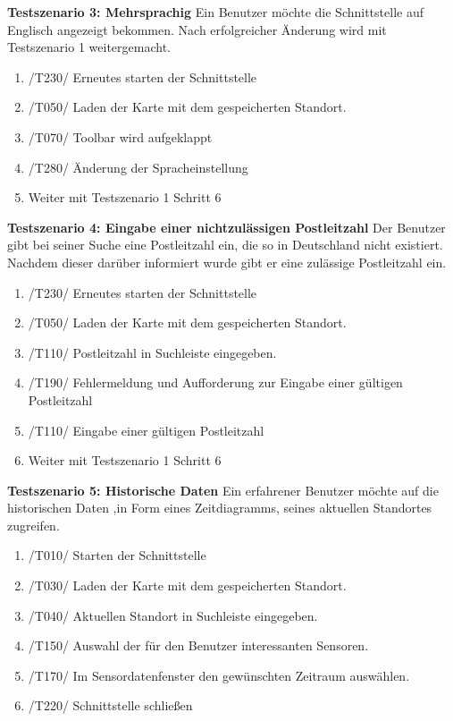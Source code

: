 \textbf{Testszenario 3: Mehrsprachig}
\newline
Ein Benutzer möchte die Schnittstelle auf Englisch angezeigt bekommen. Nach erfolgreicher Änderung wird mit Testszenario 1 weitergemacht.
\begin{enumerate} [noitemsep]
    \item /T230/ Erneutes starten der Schnittstelle
    \item /T050/ Laden der Karte mit dem gespeicherten Standort.
    \item /T070/ Toolbar wird aufgeklappt
    \item /T280/ Änderung der Spracheinstellung
    \item Weiter mit Testszenario 1 Schritt 6
\end{enumerate}

\textbf{Testszenario 4: Eingabe einer nichtzulässigen Postleitzahl}
\newline
Der Benutzer gibt bei seiner Suche eine Postleitzahl ein, die so in Deutschland nicht existiert. Nachdem dieser darüber informiert wurde gibt er eine zulässige Postleitzahl ein.
\begin{enumerate} [noitemsep]
    \item /T230/ Erneutes starten der Schnittstelle
    \item /T050/ Laden der Karte mit dem gespeicherten Standort.
    \item /T110/ Postleitzahl in Suchleiste eingegeben.
    \item /T190/ Fehlermeldung und Aufforderung zur Eingabe einer gültigen Postleitzahl
    \item /T110/ Eingabe einer gültigen Postleitzahl
    \item Weiter mit Testszenario 1 Schritt 6
\end{enumerate}

\textbf{Testszenario 5: Historische Daten}
\newline
Ein erfahrener Benutzer möchte auf die historischen Daten ,in Form eines Zeitdiagramms, seines aktuellen Standortes zugreifen.
\begin{enumerate} [noitemsep]
    \item /T010/ Starten der Schnittstelle
    \item /T030/ Laden der Karte mit dem gespeicherten Standort.
    \item /T040/ Aktuellen Standort in Suchleiste eingegeben.
    \item /T150/ Auswahl der für den Benutzer interessanten Sensoren.
    \item /T170/ Im Sensordatenfenster den gewünschten Zeitraum auswählen.
    \item /T220/ Schnittstelle schließen
\end{enumerate}

